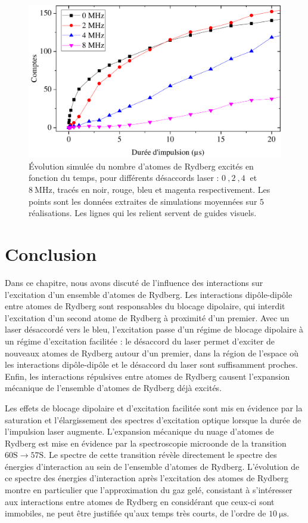 \begin{figure}[h]
\centering
\includegraphics[width=\linewidth]{figures/low_l/satur_optical_sim}
\caption[\'Evolution simulée du nombre d'atomes de Rydberg excités en fonction du temps pour différents désaccords laser]{
\'Evolution simulée du nombre d'atomes de Rydberg excités en fonction du temps, pour différents désaccords laser : $\SI{0}{},\SI{2}{},\SI{4}{}$ et $\SI{8}{\MHz}$, tracés en noir, rouge, bleu et magenta respectivement.
Les points sont les données extraites de simulations moyennées sur $\SI{5}{}$ réalisations. Les lignes qui les relient servent de guides visuels.
}
\label{fig:satur_optical_sim}
\end{figure}

\clearpage
\section*{Conclusion}
\noindent Dans ce chapitre, nous avons discuté de l'influence des interactions sur l'excitation d'un ensemble d'atomes de Rydberg.
Les interactions dipôle-dipôle entre atomes de Rydberg sont responsables du blocage dipolaire, qui interdit l'excitation d'un second atome de Rydberg à proximité d'un premier.
Avec un laser désaccordé vers le bleu, l'excitation passe d'un régime de blocage dipolaire à un régime d'excitation facilitée : le désaccord du laser permet d'exciter de nouveaux atomes de Rydberg autour d'un premier, dans la région de l'espace où les interactions dipôle-dipôle et le désaccord du laser sont suffisamment proches.
Enfin, les interactions répulsives entre atomes de Rydberg causent l'expansion mécanique de l'ensemble d'atomes de Rydberg déjà excités.

Les effets de blocage dipolaire et d'excitation facilitée sont mis en évidence par la saturation et l'élargissement des spectres d'excitation optique lorsque la durée de l'impulsion laser augmente.
L'expansion mécanique du nuage d'atomes de Rydberg est mise en évidence par la spectroscopie microonde de la transition $\mathrm{60S}\rightarrow\mathrm{57S}$.
Le spectre de cette transition révèle directement le spectre des énergies d'interaction au sein de l'ensemble d'atomes de Rydberg.
L'évolution de ce spectre des énergies d'interaction après l'excitation des atomes de Rydberg montre en particulier que l'approximation du gaz gelé, consistant à s'intéresser aux interactions entre atomes de Rydberg en considérant que ceux-ci sont immobiles, ne peut être justifiée qu'aux temps très courts, de l'ordre de $\SI{10}{\us}$.

